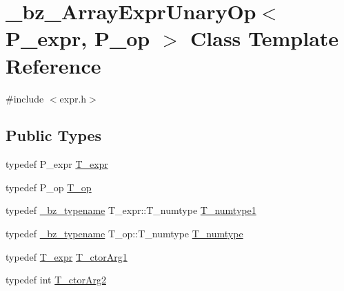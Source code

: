 \hypertarget{class__bz__ArrayExprUnaryOp}{}\section{\+\_\+bz\+\_\+\+Array\+Expr\+Unary\+Op$<$ P\+\_\+expr, P\+\_\+op $>$ Class Template Reference}
\label{class__bz__ArrayExprUnaryOp}


{\ttfamily \#include $<$expr.\+h$>$}

\subsection*{Public Types}
\begin{DoxyCompactItemize}
\item 
typedef P\+\_\+expr \hyperlink{class__bz__ArrayExprUnaryOp_aa7e8d93e795781e0f9bed0120b380365}{T\+\_\+expr}
\item 
typedef P\+\_\+op \hyperlink{class__bz__ArrayExprUnaryOp_a3d3a509583d155eab8772ca247985bc7}{T\+\_\+op}
\item 
typedef \hyperlink{compiler_8h_a1bc40add3e72effc9cf69dbe445cbdfd}{\+\_\+bz\+\_\+typename} T\+\_\+expr\+::\+T\+\_\+numtype \hyperlink{class__bz__ArrayExprUnaryOp_a5639f61afc3875934b57d495a4b95faf}{T\+\_\+numtype1}
\item 
typedef \hyperlink{compiler_8h_a1bc40add3e72effc9cf69dbe445cbdfd}{\+\_\+bz\+\_\+typename} T\+\_\+op\+::\+T\+\_\+numtype \hyperlink{class__bz__ArrayExprUnaryOp_a89bf264c814e1fa55026c4389ad34085}{T\+\_\+numtype}
\item 
typedef \hyperlink{class__bz__ArrayExprUnaryOp_aa7e8d93e795781e0f9bed0120b380365}{T\+\_\+expr} \hyperlink{class__bz__ArrayExprUnaryOp_a799ed0cf587665fe7429bdd30bd11ca9}{T\+\_\+ctor\+Arg1}
\item 
typedef int \hyperlink{class__bz__ArrayExprUnaryOp_a9b357117af9cabcc992e7b57e6c3e231}{T\+\_\+ctor\+Arg2}
\end{DoxyCompactItemize}
